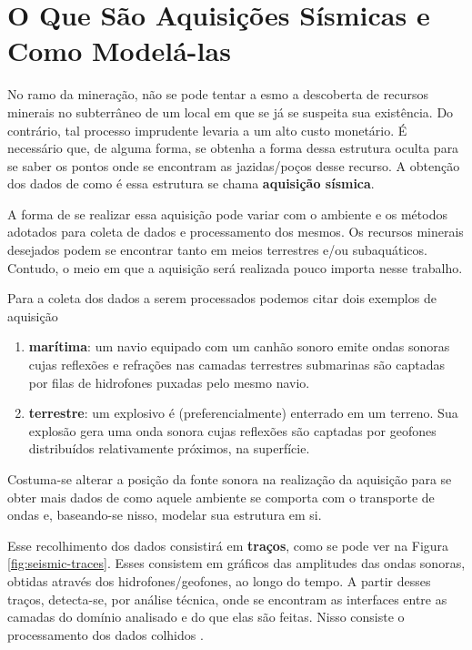 \section{O Que São Aquisições Sísmicas e Como Modelá-las}

No ramo da mineração, não se pode tentar a esmo a descoberta de recursos
minerais no subterrâneo de um local em que se já se suspeita sua existência.
Do contrário, tal processo imprudente levaria a um alto custo monetário.
É necessário que, de alguma forma, se obtenha a forma dessa estrutura oculta
para se saber os pontos onde se encontram as jazidas/poços desse recurso.
A obtenção dos dados de como é essa estrutura se chama \textbf{aquisição
	sísmica}.

A forma de se realizar essa aquisição pode variar com o ambiente e os
métodos adotados para coleta de dados e processamento dos mesmos. Os
recursos minerais desejados podem se encontrar tanto em meios terrestres
e/ou subaquáticos. Contudo, o meio em que a aquisição será realizada pouco
importa nesse trabalho.

Para a coleta dos dados a serem processados podemos citar dois exemplos
de aquisição
\begin{enumerate}
	\item \textbf{marítima}: um navio equipado com um canhão
	      sonoro emite ondas sonoras cujas reflexões e refrações nas camadas
	      terrestres submarinas são captadas por filas de hidrofones puxadas pelo
	      mesmo navio.
	\item \textbf{terrestre}: um explosivo é (preferencialmente) enterrado
	      em um terreno. Sua explosão gera uma onda sonora cujas
	      reflexões são captadas por geofones distribuídos relativamente próximos,
	      na superfície.
\end{enumerate}

Costuma-se alterar a posição da fonte sonora na realização da aquisição para
se obter mais dados de como aquele ambiente se
comporta com o transporte de ondas e, baseando-se nisso, modelar sua estrutura
em si.

Esse recolhimento dos dados consistirá em \textbf{traços}, como se pode ver na Figura
\ref{fig:seismic-traces}. Esses consistem em gráficos das amplitudes das ondas sonoras,
obtidas através dos hidrofones/geofones, ao longo do tempo.
A partir desses traços, detecta-se, por análise técnica, onde se
encontram as interfaces entre as camadas do domínio analisado e do que elas são feitas.
Nisso consiste o processamento dos dados colhidos \cite{notasAulas2017}.

